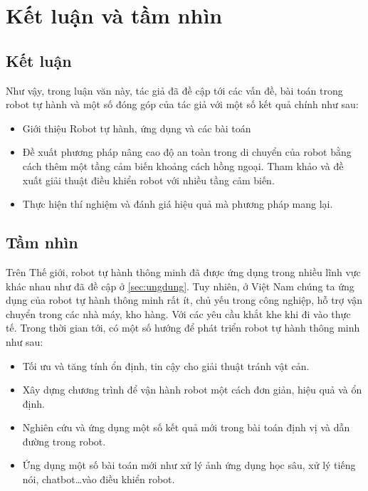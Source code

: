 \chapter{Kết luận và tầm nhìn}
\label{chap:KetLuan}

\section{Kết luận}

Như vậy, trong luận văn này, tác giả đã đề cập tới các vấn đề, bài toán trong robot tự hành và một số đóng góp của tác giả với một số kết quả chính như sau:
\begin{itemize}
    \item Giới thiệu Robot tự hành, ứng dụng và các bài toán
    \item Đề xuất phương pháp nâng cao độ an toàn trong di chuyển của robot bằng cách thêm một tầng cảm biến khoảng cách hồng ngoại. Tham khảo và đề xuất giải thuật điều khiển robot với nhiều tầng cảm biến.
    \item Thực hiện thí nghiệm và đánh giá hiệu quả mà phương pháp mang lại.
\end{itemize}


\section{Tầm nhìn}
Trên Thế giới, robot tự hành thông minh đã được ứng dụng trong nhiều lĩnh vực khác nhau như đã đề cập ở \ref{sec:ungdung}. Tuy nhiên, ở Việt Nam chúng ta ứng dụng của robot tự hành thông minh rất ít, chủ yếu trong công nghiệp, hỗ trợ vận chuyển trong các nhà máy, kho hàng. Với các yêu cầu khắt khe khi đi vào thực tế. Trong thời gian tới, có một số hướng để phát triển robot tự hành thông minh như sau:
\begin{itemize}
    \item Tối ưu và tăng tính ổn định, tin cậy cho giải thuật tránh vật cản.
    \item Xây dựng chương trình để vận hành robot một cách đơn giản, hiệu quả và ổn định.
    \item Nghiên cứu và ứng dụng một số kết quả mới trong bài toán định vị và dẫn đường trong robot.
    \item Ứng dụng một số bài toán mới như xử lý ảnh ứng dụng học sâu, xử lý tiếng nói, chatbot\dots vào điều khiển robot.
\end{itemize}



